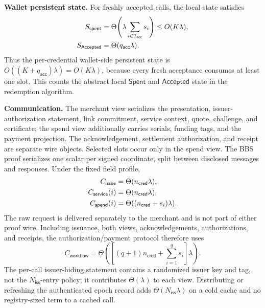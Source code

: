 \documentclass[letterpaper]{article}
\begin{document}
\textbf{Wallet persistent state.}
For freshly accepted calls, the local state satisfies
\begin{equation}
\ifdefined\MMAAAITwoColumn
\begin{aligned}
S_{\mathsf{spent}}&=\Theta\!\left(
  \lambda\sum_{i\in\mathcal I_{\mathsf{acc}}}s_i\right)
  \le O(K\lambda),\\
S_{\mathsf{Accepted}}&=\Theta(q_{\mathsf{acc}}\lambda).
\end{aligned}
\else
S_{\mathsf{spent}}=\Theta\!\left(
  \lambda\sum_{i\in\mathcal I_{\mathsf{acc}}}s_i\right)
\le O(K\lambda),\qquad
S_{\mathsf{Accepted}}=\Theta(q_{\mathsf{acc}}\lambda).
\fi
\end{equation}
Thus the per-credential wallet-side persistent state is
\(O((K+q_{\mathsf{acc}})\lambda)=O(K\lambda)\), because every fresh
acceptance consumes at least one slot.  This counts the abstract local
\(\mathsf{Spent}\) and \(\mathsf{Accepted}\) state in the redemption algorithm.

\textbf{Communication.}
The merchant view serializes the presentation, issuer-authorization statement,
link commitment, service context, quote, challenge, and certificate;
the spend view additionally carries serials, funding tags, and the payment
projection.  The acknowledgement, settlement
authorization, and receipt are separate wire objects.  Selected slots occur
only in the spend view.  The BBS proof serializes one scalar per signed
coordinate, split between disclosed messages and responses.  Under the fixed
field profile,
\begin{equation}
\ifdefined\MMAAAITwoColumn
\begin{aligned}
C_{\mathsf{issue}}&=\Theta(n_{\mathsf{cred}}\lambda),\\
C_{\mathsf{service}}(i)&=\Theta(n_{\mathsf{cred}}\lambda),\\
C_{\mathsf{spend}}(i)&=\Theta((n_{\mathsf{cred}}+s_i)\lambda).
\end{aligned}
\else
C_{\mathsf{issue}}=\Theta(n_{\mathsf{cred}}\lambda),\quad
C_{\mathsf{service}}(i)=\Theta(n_{\mathsf{cred}}\lambda),\quad
C_{\mathsf{spend}}(i)=\Theta((n_{\mathsf{cred}}+s_i)\lambda).
\fi
\end{equation}
The raw request is delivered separately to the merchant and is not part of
either proof wire.  Including issuance, both views, acknowledgements,
authorizations, and receipts, the authorization/payment protocol therefore
uses
\begin{equation}
C_{\mathsf{workflow}}=\Theta\!\left(
\left[(q+1)n_{\mathsf{cred}}+\sum_{i=1}^{q}s_i\right]\lambda
\right).
\end{equation}
The per-call issuer-hiding statement contains a randomized issuer key and tag,
not the \(N_{\mathsf{iss}}\)-entry policy; it contributes \(\Theta(\lambda)\)
to each view.  Distributing or refreshing the authenticated epoch record adds
\(\Theta(N_{\mathsf{iss}}\lambda)\) on a cold cache and no registry-sized term
to a cached call.
\end{document}
